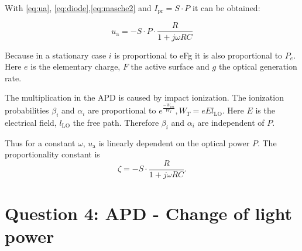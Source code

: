 With \eqref{eq:ua}, \eqref{eq:diode},\eqref{eq:masche2} and $I_{\mathrm{pr}}=S\cdot P$ it can be obtained:

\begin{equation}
 u_{\mathrm{a}} =  -S\cdot P\cdot \frac{R}{1+ j\omega RC}
\end{equation}

Because in a stationary case $i$ is proportional to eFg it is also proportional to $P_e$. Here $e$ is the elementary charge, $F$ the active surface and $g$ the optical generation rate.
 
The multiplication in the APD is caused by impact ionization. The ionization probabilities $\beta_i$ and $\alpha_i$ are proportional to $e^{\frac{-W_{\mathrm{ion}}}{W_T}},  W_T=eEl_\mathrm{LO}$. Here $E$ is the electrical field, $l_\mathrm{LO}$ the free path. Therefore $\beta_i$ and $\alpha_i$ are independent of $P$.


Thus for a constant $\omega$, $u_{\mathrm{a}}$ is linearly dependent on the optical power $P$. The proportionality constant is 
\begin{equation}
\zeta = -S\cdot \frac{R}{1+ j\omega RC}.
\label{eq:}
\end{equation}
 
\section{Question 4: APD - Change of light power}

